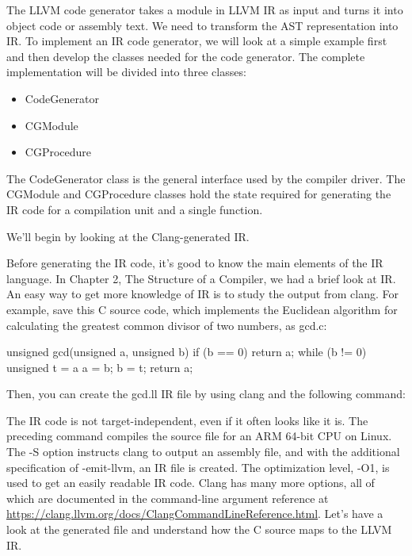 
The LLVM code generator takes a module in LLVM IR as input and turns it into object code or assembly
text. We need to transform the AST representation into IR. To implement an IR code generator, we
will look at a simple example first and then develop the classes needed for the code generator. The
complete implementation will be divided into three classes:

\begin{itemize}
\item
CodeGenerator

\item
CGModule

\item
CGProcedure
\end{itemize}

The CodeGenerator class is the general interface used by the compiler driver. The CGModule
and CGProcedure classes hold the state required for generating the IR code for a compilation unit
and a single function.

We’ll begin by looking at the Clang-generated IR.


Before generating the IR code, it’s good to know the main elements of the IR language. In Chapter 2, The Structure of a Compiler, we had a brief look at IR. An easy way to get more knowledge of IR is to study the output from clang. For example, save this C source code, which implements the Euclidean algorithm for calculating the greatest common divisor of two numbers, as gcd.c:

\begin{cpp}
unsigned gcd(unsigned a, unsigned b) {
    if (b == 0)
    return a;
    while (b != 0) {
        unsigned t = a %
        a = b;
        b = t;
    }
    return a;
}
\end{cpp}

Then, you can create the gcd.ll IR file by using clang and the following command:


The IR code is not target-independent, even if it often looks like it is. The preceding command compiles the source file for an ARM 64-bit CPU on Linux. The -S option instructs clang to output an assembly file, and with the additional specification of -emit-llvm, an IR file is created. The optimization level, -O1, is used to get an easily readable IR code. Clang has many more options, all of which are documented in the command-line argument reference at \url{https://clang.llvm.org/docs/ClangCommandLineReference.html}. Let’s have a look at the generated file and understand how the C source maps to the LLVM IR.

